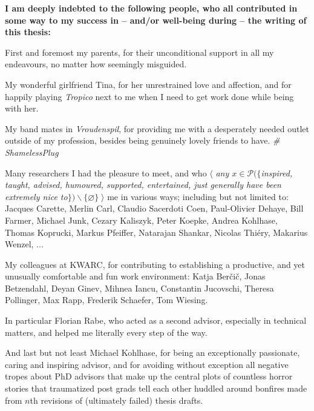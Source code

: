 \newpage

\thispagestyle{empty}

\begin{center}
\textbf{I am deeply indebted to the following people, who all contributed in some way to my success in -- and/or well-being during -- the writing
of this thesis:}\bigskip

First and foremost my parents, for their unconditional support in all my endeavours, no matter how seemingly misguided.\bigskip

My wonderful girlfriend Tina, for her unrestrained love and affection, and for happily playing \emph{Tropico} next to me when I need to get work done while being with her.\bigskip

My band mates in \emph{Vroudenspil}, for providing me with a desperately needed outlet outside of my profession, besides being genuinely lovely friends to have. \emph{\# ShamelessPlug}\bigskip

Many researchers I had the pleasure to meet, and who $\langle$\emph{ any $x\in\mathcal P(\{$inspired, taught, advised, humoured, supported, entertained, just generally have been extremely nice to$\})\backslash\{\varnothing\}$}$\;\rangle$ me in various ways; including but not limited to: Jacques Carette, Merlin Carl, Claudio Sacerdoti Coen, Paul-Olivier Dehaye, Bill Farmer, Michael Junk, Cezary Kaliszyk, Peter Koepke, Andrea Kohlhase, Thomas Koprucki, Markus Pfeiffer, Natarajan Shankar, Nicolas Thiéry, Makarius Wenzel, ...\bigskip

My colleagues at KWARC, for contributing to establishing a productive, and yet unusually comfortable and fun work environment: Katja Ber\v ci\v c, Jonas Betzendahl, Deyan Ginev, Mihnea Iancu, Constantin Jucovschi, Theresa Pollinger, Max Rapp, Frederik Schaefer, Tom Wiesing. 

In particular Florian Rabe, who acted as a second advisor, especially in technical matters, and helped me literally every step of the way.\bigskip

And last but not least Michael Kohlhase, for being an exceptionally passionate, caring and inspiring advisor, and for avoiding without exception all negative tropes about PhD advisors that make up the central plots of countless horror stories that traumatized post grads tell each other huddled around bonfires made from $n$th revisions of (ultimately failed) thesis drafts.
\end{center}\bigskip

\newpage

